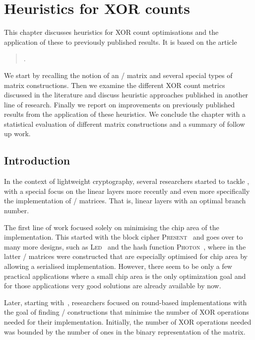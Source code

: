 \chapter{Heuristics for XOR counts}\label{ch:slp}
\hspace{1.5em}
This chapter discusses heuristics for XOR count optimisations and the application of these to previously published results.
It is based on the article
\begin{quote}
    .
\end{quote}

We start by recalling the notion of an \MDSs/ matrix and several special types of matrix constructions.
Then we examine the different XOR count metrics discussed in the literature and discuss heuristic approaches published in another line of research.
Finally we report on improvements on previously published results from the application of these heuristics.
We conclude the chapter with a statistical evaluation of different matrix constructions and a summary of follow up work.

\section{Introduction}
In the context of lightweight cryptography, several researchers started to tackle , with a special focus on the linear layers more recently and even more specifically the implementation of \MDS/ matrices.
That is, linear layers with an optimal branch number.

The first line of work focused solely on minimising the chip area of the implementation.
This started with the block cipher \textsc{Present}~\cite{CHES:BKLPPR07} and goes over to many more designs, such as \textsc{Led}~\cite{CHES:GPPR11} and the hash function \textsc{Photon}~\cite{C:GuoPeyPos11}, where in the latter \MDS/ matrices were constructed that are especially optimised for chip area by allowing a serialised implementation.
However, there seem to be only a few practical applications where a small chip area is the only optimization goal and for those applications very good solutions are already available by now.

Later, starting with~\cite{CHES:KPPY14}, researchers focused on round-based implementations with the goal of finding \MDS/ constructions that minimise the number of XOR operations needed for their implementation.
Initially, the number of XOR operations needed was bounded by the number of ones in the binary representation of the matrix.

